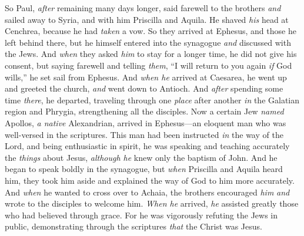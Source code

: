 \begin{biblechapter}
 So Paul, \textit{after} remaining many days longer, said farewell to the brothers \textit{and} sailed away to Syria, and with him Priscilla and Aquila. He shaved \textit{his} head at Cenchrea, because he had \textit{taken} a vow.
\verse So they arrived at Ephesus, and those he left behind there, but he himself entered into the synagogue \textit{and} discussed with the Jews.
\verse And \textit{when} they asked \textit{him} to stay for a longer time, he did not give his consent,
\verse but saying farewell and telling \textit{them}, “I will return to you again \textit{if} God wills,” he set sail from Ephesus.
\verse And \textit{when he} arrived at Caesarea, he went up and greeted the church, \textit{and} went down to Antioch.
\verse And \textit{after} spending some time \textit{there}, he departed, traveling through one \textit{place} after another \textit{in} the Galatian region and Phrygia, strengthening all the disciples.
 Now a certain Jew \textit{named} Apollos, \textit{a native} Alexandrian, arrived in Ephesus—an eloquent man who was well-versed in the scriptures.
\verse This man had been instructed \textit{in} the way of the Lord, and being enthusiastic in spirit, he was speaking and teaching accurately the \textit{things} about Jesus, \textit{although he} knew only the baptism of John.
\verse And he began to speak boldly in the synagogue, but \textit{when} Priscilla and Aquila heard him, they took him aside and explained the way of God to him more accurately.
\verse And \textit{when} he wanted to cross over to Achaia, the brothers encouraged \textit{him} \textit{and} wrote to the disciples to welcome him. \textit{When he} arrived, \textit{he} assisted greatly those who had believed through grace.
\verse For he was vigorously refuting the Jews in public, demonstrating through the scriptures \textit{that} the Christ was Jesus.
\end{biblechapter}

